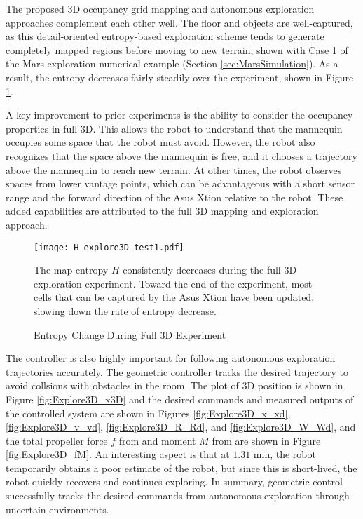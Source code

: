 The proposed 3D occupancy grid mapping and autonomous exploration approaches complement each other well. The floor and objects are well-captured, as this detail-oriented entropy-based exploration scheme tends to generate completely mapped regions before moving to new terrain, shown with Case 1 of the Mars exploration numerical example (Section \ref{sec:MarsSimulation}). As a result, the entropy decreases fairly steadily over the experiment, shown in Figure \ref{fig:Explore3D_H}.

A key improvement to prior experiments is the ability to consider the occupancy properties in full 3D. This allows the robot to understand that the mannequin occupies some space that the robot must avoid. However, the robot also recognizes that the space above the mannequin is free, and it chooses a trajectory above the mannequin to reach new terrain. At other times, the robot observes spaces from lower vantage points, which can be advantageous with a short sensor range and the forward direction of the Asus Xtion relative to the robot. These added capabilities are attributed to the full 3D mapping and exploration approach.

\begin{figure}
	\centering
	\texttt{[image: H\_explore3D\_test1.pdf]}
	\caption{Entropy Change During Full 3D Experiment}
	\medskip
	\small
	The map entropy $H$ consistently decreases during the full 3D exploration experiment. Toward the end of the experiment, most cells that can be captured by the Asus Xtion have been updated, slowing down the rate of entropy decrease.
	\label{fig:Explore3D_H}
\end{figure}

The controller is also highly important for following autonomous exploration trajectories accurately. The geometric controller tracks the desired trajectory to avoid collsions with obstacles in the room. The plot of 3D position is shown in Figure \ref{fig:Explore3D_x3D} and the desired commands and measured outputs of the controlled system are shown in Figures \ref{fig:Explore3D_x_xd}, \ref{fig:Explore3D_v_vd}, \ref{fig:Explore3D_R_Rd}, and \ref{fig:Explore3D_W_Wd}, and the total propeller force $f$ from  and moment $M$ from  are shown in Figure \ref{fig:Explore3D_fM}. An interesting aspect is that at $1.31$ min, the robot temporarily obtains a poor estimate of the robot, but since this is short-lived, the robot quickly recovers and continues exploring. In summary, geometric control successfully tracks the desired commands from autonomous exploration through uncertain environments.

